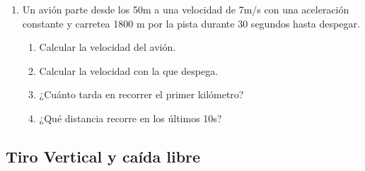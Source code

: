 \begin{enumerate}
    \item Un avión parte desde los 50m a una velocidad de 7m/s con una aceleración constante y carretea 1800 m por la pista durante 30 segundos hasta despegar.

    \begin{enumerate}
    \item Calcular la velocidad del avión.
    \item Calcular la velocidad con la que despega.
    \item ¿Cuánto tarda en recorrer el primer kilómetro?
    \item ¿Qué distancia recorre en los últimos 10s?
    \end{enumerate}
\end{enumerate}

\newpage

\subsection*{Tiro Vertical y caída libre}

